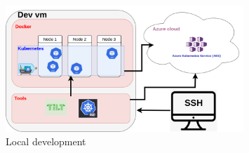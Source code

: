 \begin{figure}[H]
    \centering
    \includegraphics[width=0.8\textwidth]{pictures/development_setup.png}
    \caption{ Local development }
    \label{fig:local_development}
\end{figure}